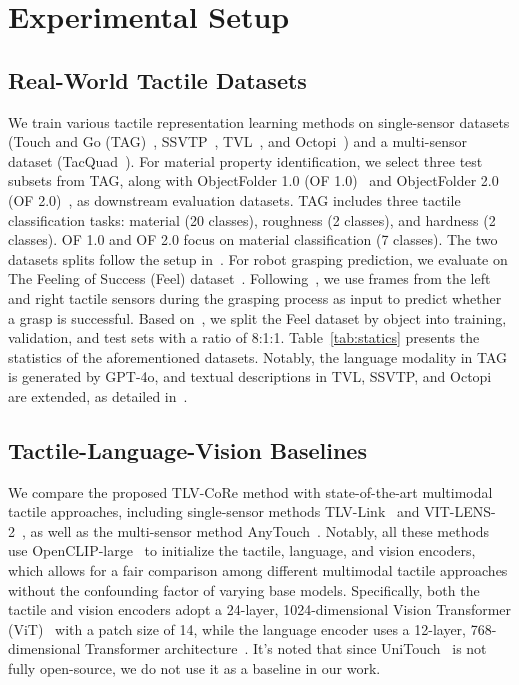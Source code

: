 \documentclass[letterpaper]{article} %
\theoremstyle{definition}                %
\theoremstyle{plain}                     %
\theoremstyle{remark}                    %
\begin{document}
\section{Experimental Setup}
\label{subsec: Experimental}



\subsection{Real-World Tactile Datasets}
\label{sec:dataset}

We train various tactile representation learning methods on single-sensor datasets (Touch and Go (TAG)~\cite{yang2022touch}, SSVTP~\cite{kerr2022self}, TVL~\cite{fu2024tou}, and Octopi~\cite{yu2024octopi}) and a multi-sensor dataset (TacQuad~\cite{feng2025anytouch}). For material property identification, we select three test subsets from TAG, along with ObjectFolder 1.0 (OF 1.0)~\cite{gao2021objectfolder} and ObjectFolder 2.0 (OF 2.0)~\cite{gao2022objectfolder}, as downstream evaluation datasets. TAG includes three tactile classification tasks: material (20 classes), roughness (2 classes), and hardness (2 classes). OF 1.0 and OF 2.0 focus on material classification (7 classes). The two datasets splits follow the setup in~\cite{yang2024binding}. For robot grasping prediction, we evaluate on The Feeling of Success (Feel) dataset~\cite{calandra2017feeling}. Following~\cite{feng2025anytouch}, we use frames from the left and right tactile sensors during the grasping process as input to predict whether a grasp is successful. Based on~\cite{yang2024binding, cheng2025touch100k}, we split the Feel dataset by object into training, validation, and test sets with a ratio of 8:1:1. Table~\ref{tab:statics} presents the statistics of the aforementioned datasets. Notably, the language modality in TAG is generated by GPT-4o, and textual descriptions in TVL, SSVTP, and Octopi are extended, as detailed in~\cite{feng2025anytouch}.

\subsection{Tactile-Language-Vision Baselines}
\label{sec:baseline}

We compare the proposed TLV-CoRe method with state-of-the-art multimodal tactile approaches, including single-sensor methods TLV-Link~\cite{cheng2025touch100k} and VIT-LENS-2~\cite{lei2024vit}, as well as the multi-sensor method AnyTouch~\cite{feng2025anytouch}. Notably, all these methods use OpenCLIP-large~\cite{cherti2023reproducible} to initialize the tactile, language, and vision encoders, which allows for a fair comparison among different multimodal tactile approaches without the confounding factor of varying base models. Specifically, both the tactile and vision encoders adopt a 24-layer, 1024-dimensional Vision Transformer (ViT)~\cite{dosovitskiy2020image} with a patch size of 14, while the language encoder uses a 12-layer, 768-dimensional Transformer architecture~\cite{vaswani2017attention}. It's noted that since UniTouch~\cite{yang2024binding} is not fully open-source, we do not use it as a baseline in our work.
\end{document}
